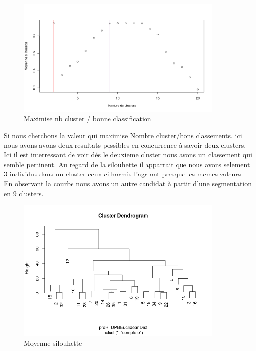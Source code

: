 %
%

\begin{figure}[H]
\centering
\includegraphics[width=0.90\textwidth]{../Fig/RTUPB/rtupb-silpam-pre}
\caption{Maximise nb cluster / bonne classification}
\end{figure}

Si nous cherchons la valeur qui maximise Nombre cluster/bons classements. ici nous avons avons deux resultats possibles en 
concurrence à savoir deux clusters. 
Ici il est interressant de voir dés le deuxieme cluster nous avons un classement qui semble pertinent. Au regard de la silouhette 
il apparrait que nous avons selement 3 individus dans un cluster ceux ci hormis l'age ont presque  les memes valeurs. En observant la courbe  nous avons un autre candidat à partir d'une segmentation en 9 clusters. 

\begin{figure}[h]
\centering
\includegraphics[width=0.90\textwidth]{../Fig/RTUPB/rtupb-cah-empty.png}
\caption{Moyenne silouhette }
\end{figure}

